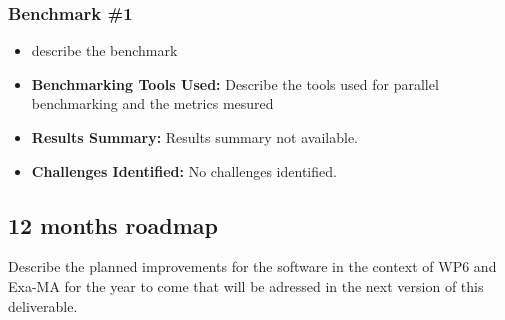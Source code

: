 \subsubsection{Benchmark \#1}
\begin{itemize}
    \item describe the benchmark
    \item \textbf{Benchmarking Tools Used:} Describe the tools used for parallel benchmarking and the metrics mesured
    \item \textbf{Results Summary:} Results summary not available.
    \item \textbf{Challenges Identified:} No challenges identified.
\end{itemize}

\subsection{12 months roadmap}
\label{sec:WP6:Uranie:roadmap}

Describe the planned improvements  for the software in the context of WP6 and Exa-MA for the year to come that will be adressed in the next version of this deliverable.